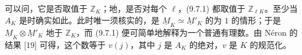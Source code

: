 可以问，它是否取值于 $\mathbb Z_K$；地，是否对每个 $\ell$，(9.7.1) 都取值于 $\mathbb Z_{\ell K}$。至少当 $A_K$ 是时确实如此。此时唯一须核实的，是 $\underline M_K\simeq\underline M'_K$ 的为 $1$ 的情形；于是 $\underline M_K\otimes\underline M'_K$ 地于 $\mathbb Z_K$，而 (9.7.1) 便可简单地解释为一个普通有理数。由 Néron 的结果 [19] 可得，这个数等于 $v(j)$，其中 $j$ 是 $A_K$ 的绝对，$v$ 是 $K$ 的规范化。
